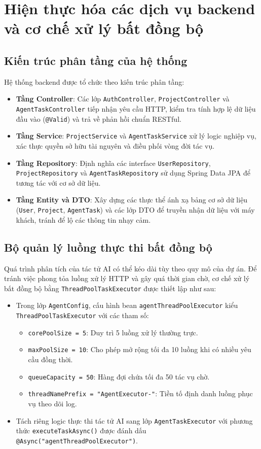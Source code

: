 \documentclass[12pt,a4paper]{report}
\begin{document}
\section{Hiện thực hóa các dịch vụ backend và cơ chế xử lý bất đồng bộ}

\subsection{Kiến trúc phân tầng của hệ thống}
Hệ thống backend được tổ chức theo kiến trúc phân tầng:
\begin{itemize}
    \item \textbf{Tầng Controller}: Các lớp \texttt{AuthController}, \texttt{ProjectController} và \texttt{AgentTaskController} tiếp nhận yêu cầu HTTP, kiểm tra tính hợp lệ dữ liệu đầu vào (\texttt{@Valid}) và trả về phản hồi chuẩn RESTful.
    \item \textbf{Tầng Service}: \texttt{ProjectService} và \texttt{AgentTaskService} xử lý logic nghiệp vụ, xác thực quyền sở hữu tài nguyên và điều phối vòng đời tác vụ.
    \item \textbf{Tầng Repository}: Định nghĩa các interface \texttt{UserRepository}, \texttt{ProjectRepository} và \texttt{AgentTaskRepository} sử dụng Spring Data JPA để tương tác với cơ sở dữ liệu.
    \item \textbf{Tầng Entity và DTO}: Xây dựng các thực thể ánh xạ bảng cơ sở dữ liệu (\texttt{User}, \texttt{Project}, \texttt{AgentTask}) và các lớp DTO để truyền nhận dữ liệu với máy khách, tránh để lộ các thông tin nhạy cảm.
\end{itemize}

\subsection{Bộ quản lý luồng thực thi bất đồng bộ}
Quá trình phân tích của tác tử AI có thể kéo dài tùy theo quy mô của dự án. Để tránh việc phong tỏa luồng xử lý HTTP và gây quá thời gian chờ, cơ chế xử lý bất đồng bộ bằng \texttt{ThreadPoolTaskExecutor} được thiết lập như sau:
\begin{itemize}
    \item Trong lớp \texttt{AgentConfig}, cấu hình bean \texttt{agentThreadPoolExecutor} kiểu \texttt{ThreadPoolTaskExecutor} với các tham số:
    \begin{itemize}
        \item \texttt{corePoolSize = 5}: Duy trì 5 luồng xử lý thường trực.
        \item \texttt{maxPoolSize = 10}: Cho phép mở rộng tối đa 10 luồng khi có nhiều yêu cầu đồng thời.
        \item \texttt{queueCapacity = 50}: Hàng đợi chứa tối đa 50 tác vụ chờ.
        \item \texttt{threadNamePrefix = "AgentExecutor-"}: Tiền tố định danh luồng phục vụ theo dõi log.
    \end{itemize}
    \item Tách riêng logic thực thi tác tử AI sang lớp \texttt{AgentTaskExecutor} với phương thức \texttt{executeTaskAsync()} được đánh dấu \texttt{@Async("agentThreadPoolExecutor")}.
\end{itemize}
\end{document}
